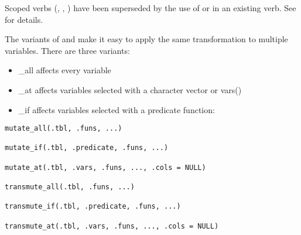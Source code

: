 \documentclass[a4paper]{book}
\begin{document}
%
\begin{Description}
\strong{[Superseded]}

Scoped verbs (, , ) have been superseded by the use of
 or  in an existing verb. See  for
details.

The  variants of  and  make it easy to apply
the same transformation to multiple variables. There are three variants:
\begin{itemize}

\item{} \_all affects every variable
\item{} \_at affects variables selected with a character vector or vars()
\item{} \_if affects variables selected with a predicate function:

\end{itemize}

\end{Description}
%
\begin{Usage}
\begin{verbatim}
mutate_all(.tbl, .funs, ...)

mutate_if(.tbl, .predicate, .funs, ...)

mutate_at(.tbl, .vars, .funs, ..., .cols = NULL)

transmute_all(.tbl, .funs, ...)

transmute_if(.tbl, .predicate, .funs, ...)

transmute_at(.tbl, .vars, .funs, ..., .cols = NULL)
\end{verbatim}
\end{Usage}
%
\end{document}
